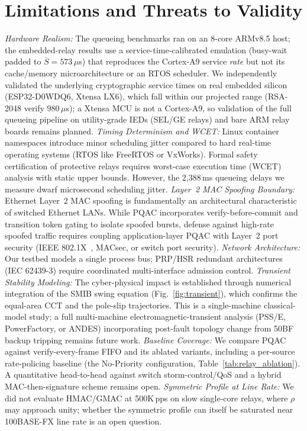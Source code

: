 \documentclass[journal]{IEEEtran}
\begin{document}
\section{Limitations and Threats to Validity}
\label{sec:limitations}
\textit{Hardware Realism:} The queueing benchmarks ran on an 8-core ARMv8.5 host; the embedded-relay results use a service-time-calibrated emulation (busy-wait padded to $\overline{S}=573\,\mu$s) that reproduces the Cortex-A9 service \emph{rate} but not its cache/memory microarchitecture or an RTOS scheduler. We independently validated the underlying cryptographic service times on real embedded silicon (ESP32-D0WDQ6, Xtensa LX6), which fall within our projected range (RSA-2048 verify $980\,\mu$s); a Xtensa MCU is not a Cortex-A9, so validation of the full queueing pipeline on utility-grade IEDs (SEL/GE relays) and bare ARM relay boards remains planned.
\textit{Timing Determinism and WCET:} Linux container namespaces introduce minor scheduling jitter compared to hard real-time operating systems (RTOS like FreeRTOS or VxWorks). Formal safety certification of protective relays requires worst-case execution time (WCET) analysis with static upper bounds. However, the 2,388\,ms queueing delays we measure dwarf microsecond scheduling jitter.
\textit{Layer~2 MAC Spoofing Boundary:} Ethernet Layer~2 MAC spoofing is fundamentally an architectural characteristic of switched Ethernet LANs. While PQAC incorporates verify-before-commit and transition token gating to isolate spoofed bursts, defense against high-rate spoofed traffic requires coupling application-layer PQAC with Layer~2 port security (IEEE 802.1X~\cite{ieee8021x}, MACsec, or switch port security).
\textit{Network Architecture:} Our testbed models a single process bus; PRP/HSR redundant architectures (IEC 62439-3) require coordinated multi-interface admission control.
\textit{Transient Stability Modeling:} The cyber-physical impact is established through numerical integration of the SMIB swing equation (Fig.~\ref{fig:transient}), which confirms the equal-area CCT and the pole-slip trajectories. This is a single-machine classical-model study; a full multi-machine electromagnetic-transient analysis (PSS/E, PowerFactory, or ANDES) incorporating post-fault topology change from 50BF backup tripping remains future work.
\textit{Baseline Coverage:} We compare PQAC against verify-every-frame FIFO and its ablated variants, including a per-source rate-policing baseline (the No-Priority configuration, Table~\ref{tab:relay_ablation}). A quantitative head-to-head against switch storm-control/QoS and a hybrid MAC-then-signature scheme remains open.
\textit{Symmetric Profile at Line Rate:} We did not evaluate HMAC/GMAC at 500K\,pps on slow single-core relays, where $\rho$ may approach unity; whether the symmetric profile can itself be saturated near 100BASE-FX line rate is an open question.
\end{document}
